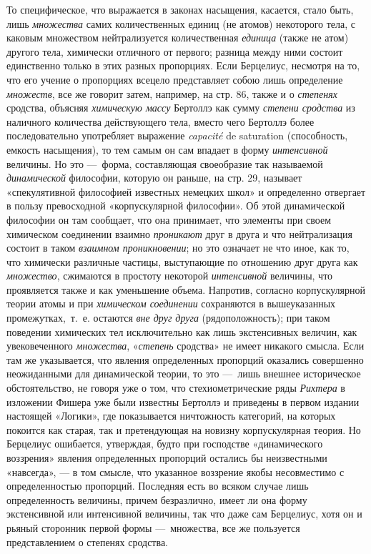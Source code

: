 То специфическое, что выражается в законах насыщения, касается, стало быть,
лишь {\em множества} самих количественных единиц (не
атомов) некоторого тела, с каковым множеством нейтрализуется количественная
{\em единица} (также не атом) другого тела, химически
отличного от первого; разница между ними состоит единственно только в этих
разных пропорциях. Если Берцелиус, несмотря на то, что его учение о
пропорциях всецело представляет собою лишь определение
{\em множеств}, все же говорит затем, например, на стр.
86, также и о {\em степенях} сродства, объясняя
{\em химическую массу} Бертоллэ как сумму
{\em степени сродства} из наличного количества
действующего тела, вместо чего Бертоллэ более последовательно употребляет
выражение {\em capacité }de saturation (способность,
емкость насыщения), то тем самым он сам впадает в форму
{\em интенсивной} величины. Но это —~форма,
составляющая своеобразие так называемой
{\em динамической} философии, которую он раньше, на
стр. 29, называет «спекулятивной философией известных немецких школ» и
определенно отвергает в пользу превосходной «корпускулярной философии». Об
этой динамической философии он там сообщает, что она принимает, что
элементы при своем химическом соединении взаимно
{\em проникают} друг в друга и что нейтрализация
состоит в таком {\em взаимном проникновении}; но это
означает не что иное, как то, что химически различные частицы, выступающие
по отношению друг друга как {\em множество}, сжимаются
в простоту некоторой {\em интенсивной} величины, что
проявляется также и как уменьшение объема. Напротив, согласно
корпускулярной теории атомы и при {\em химическом
соединении} сохраняются в вышеуказанных промежутках,~т.~е. остаются
{\em вне друг друга} (рядоположность); при таком
поведении химических тел исключительно как лишь экстенсивных величин, как
увековеченного {\em множества},
«{\em степень} сродства» не имеет никакого смысла. Если
там же указывается, что явления определенных пропорций оказались совершенно
неожиданными для динамической теории, то это —~лишь внешнее историческое
обстоятельство, не говоря уже о том, что стехиометрические ряды
{\em Рихтера} в изложении Фишера уже были известны
Бертоллэ и приведены в первом издании настоящей «Логики», где показывается 
ничтожность категорий, на которых покоится как старая, так и претендующая на
новизну корпускулярная теория. Но Берцелиус ошибается, утверждая, будто при
господстве «динамического воззрения» явления определенных пропорций
остались бы неизвестными «навсегда», — в том смысле, что указанное
воззрение якобы несовместимо с определенностью пропорций. Последняя есть во
всяком случае лишь определенность величины, причем безразлично, имеет ли
она форму экстенсивной или интенсивной величины, так что даже сам
Берцелиус, хотя он и рьяный сторонник первой формы —~множества, все же
пользуется представлением о степенях сродства.

